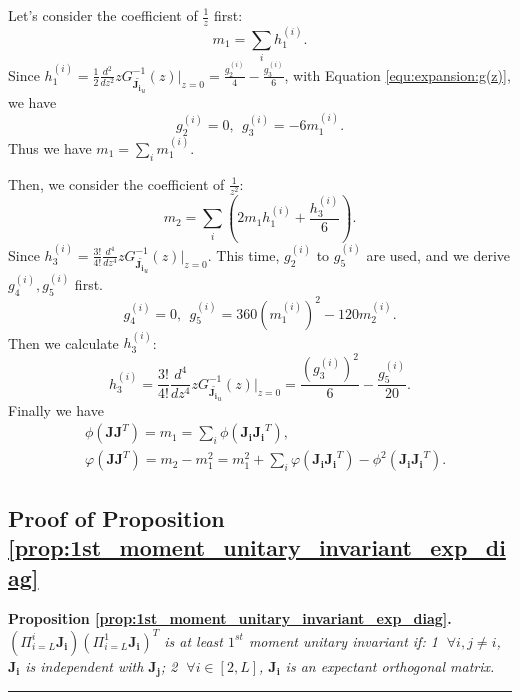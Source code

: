 \documentclass[10pt,journal,compsoc]{IEEEtran}
\begin{document}
Let's consider the coefficient of $\frac{1}{z}$ first:
\begin{equation}
    m_1 = \sum_i h_1^{(i)}.
\end{equation}
Since $h_1^{(i)} = \frac{1}{2}\frac{d^2}{dz^2}zG^{-1}_{\widetilde{\mathbf{J_i}_u}}(z)|_{z=0} = \frac{g^{(i)}_2}{4}-\frac{g^{(i)}_3}{6}$, with Equation \eqref{equ:expansion:g(z)}, we have
\begin{equation}
g_2^{(i)} = 0,~~g_3^{(i)}=-6m^{(i)}_1.
\end{equation}
Thus we have $m_1=\sum_i m_1^{(i)}$.

Then, we consider the coefficient of $\frac{1}{z^2}$:
\begin{equation}
    m_2 = \sum_i (2m_1h^{(i)}_1+\frac{h^{(i)}_3}{6}).
\end{equation}
Since $h_3^{(i)} = \frac{3!}{4!}\frac{d^4}{dz^4}zG^{-1}_{\widetilde{\mathbf{J_i}_u}}(z)|_{z=0}$. This time, $g_2^{(i)}$ to $g_5^{(i)}$ are used, and we derive $g_4^{(i)},g_5^{(i)}$ first.
\begin{equation}
    g_4^{(i)}=0,~~g_5^{(i)}=360(m^{(i)}_1)^2-120m^{(i)}_2.
\end{equation}
Then we calculate $h_3^{(i)}$:
\begin{equation}
    h_3^{(i)} = \frac{3!}{4!}\frac{d^4}{dz^4}zG^{-1}_{\widetilde{\mathbf{J_i}_u}}(z)|_{z=0} = \frac{(g_3^{(i)})^2}{6}-\frac{g_5^{(i)}}{20}.
\end{equation}
Finally we have
\begin{equation}
    \begin{split}
        & \phi(\mathbf{JJ}^T)=m_1=\sum_i \phi(\mathbf{J_iJ_i}^T),\\
        & \varphi(\mathbf{JJ}^T) = m_2 - m_1^2 = m_1^2 + \sum_i \varphi(\mathbf{J_iJ_i}^T) - \phi^2(\mathbf{J_iJ_i}^T).
    \end{split}
\label{equ:the_forge_add}
\end{equation}
 

\subsection{Proof of Proposition \ref{prop:1st_moment_unitary_invariant_exp_diag}}\label{proof:1st_moment_unitary_invariant_exp_diag}
\textbf{Proposition \ref{prop:1st_moment_unitary_invariant_exp_diag}. }\textit{
$(\Pi_{i=L}^i \mathbf{J_i})(\Pi_{i=L}^1 \mathbf{J_i})^T$ is at least $1^{st}$ moment unitary invariant if: \textcircled{1} $\forall i,j\neq i$, $\mathbf{J_i}$ is independent with $\mathbf{J_j}$; \textcircled{2} $\forall i \in [2, L]$, $\mathbf{J_i}$ is an expectant orthogonal matrix.
}
\rule[0pt]{0.48\textwidth}{0.05em}
\end{document}
